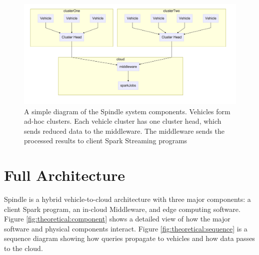\documentclass{thesis}
\begin{document}
    \begin{figure}
        \centering
        \includegraphics[width=0.8\linewidth]{binImages/theoretical-simple-system.png}
        \caption{A simple diagram of the Spindle system components. Vehicles form ad-hoc clusters.
        Each vehicle cluster has one cluster head, which sends reduced data to the middleware.
        The middleware sends the processed results to client Spark Streaming programs}
        \label{fig:theoretical:hlcomponents}
    \end{figure}

\section{Full Architecture}
    Spindle is a hybrid vehicle-to-cloud architecture with three major components: a client Spark program,
    an in-cloud Middleware, and edge computing software. Figure \ref{fig:theoretical:component} shows
    a detailed view of how the major software and physical components interact. Figure \ref{fig:theoretical:sequence}
    is a sequence diagram showing how queries propagate to vehicles and how data passes to the cloud.
\end{document}
